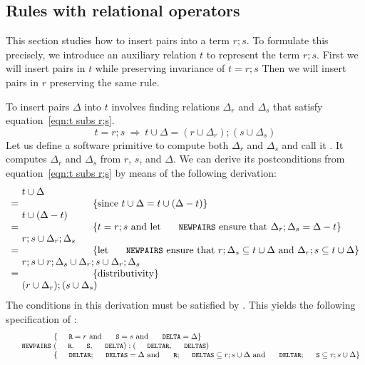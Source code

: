 \documentclass{svproc}
\begin{document}
\subsection{Rules with relational operators}
	This section studies how to insert pairs into a term $r;s$.
	To formulate this precisely, we introduce an auxiliary relation $t$ to represent the term $r;s$.
	First we will insert pairs in $t$ while preserving invariance of $t=r;s$
	Then we will insert pairs in $r$ preserving the same rule.

	To insert pairs $\Delta$ into $t$ involves finding relations $\Delta_r$ and $\Delta_s$
	that satisfy equation~\ref{eqn:t subs r;s}.
\begin{equation}
t=r;s\ \Rightarrow\ t\cup\Delta=(r\cup \Delta_r);(s\cup \Delta_s)\label{eqn:t subs r;s}
\end{equation}
	Let us define a software primitive to compute both $\Delta_r$ and $\Delta_s$ and call it .
	It computes $\Delta_r$ and $\Delta_s$ from $r$, $s$, and $\Delta$.
	We can derive its postconditions from equation~\ref{eqn:t subs r;s} by means of the following derivation:
\[\begin{array}{r@{~}l}
&t\cup\Delta\\
=&\hspace{1in}\{\text{since }t\cup\Delta=t\cup(\Delta-t)\}\\
&t\cup(\Delta-t)\\
=&\hspace{1in}\{t=r;s\text{ and let \code{NEWPAIRS} ensure that }\Delta_r;\Delta_s=\Delta-t\}\\
&r;s\cup\Delta_r;\Delta_s\\
=&\hspace{1in}\{\text{let \code{NEWPAIRS} ensure that }r;\Delta_s\subs t\cup\Delta\text{ and }\Delta_r;s\subs t\cup\Delta\}\\
&r;s\cup r;\Delta_s\cup \Delta_r;s\cup \Delta_r;\Delta_s\\
=&\hspace{1in}\{\text{distributivity}\}\\
&(r\cup \Delta_r);(s\cup \Delta_s)
\end{array}\]
	The conditions in this derivation must be satisfied by . 
	This yields the following specification of :
\[\begin{array}{r@{~}l}
&\{\code{R}=r\text{ and }\code{S}=s\text{ and }\code{DELTA}=\Delta\}\\
\code{NEWPAIRS}&(\code{R}, \code{S}, \code{DELTA}): (\code{DELTAR}, \code{DELTAS})\\
&\{\code{DELTAR};\code{DELTAS}=\Delta\text{ and }\code{R};\code{DELTAS}\subs r;s\cup\Delta\text{ and }\code{DELTAR};\code{S}\subs r;s\cup\Delta\}
\end{array}\]
\end{document}

